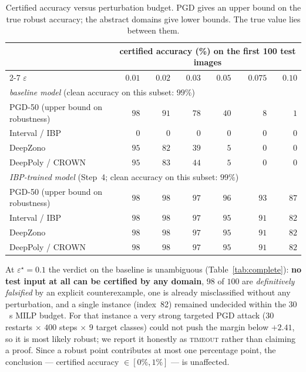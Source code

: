 \documentclass[11pt,a4paper]{article}
\newcommand{\eps}{\varepsilon}
\begin{document}
\begin{table}[H]
\centering\small
\begin{tabular}{lrrrrrr}
\toprule
& \multicolumn{6}{c}{certified accuracy (\%) on the first 100 test images}\\
\cmidrule(l){2-7}
$\eps$ & $0.01$ & $0.02$ & $0.03$ & $0.05$ & $0.075$ & $0.10$\\
\midrule
\multicolumn{7}{l}{\emph{baseline model} (clean accuracy on this subset: $99\%$)}\\
\quad PGD-50 (upper bound on robustness) & $98$ & $91$ & $78$ & $40$ & $8$ & $1$\\
\quad Interval / IBP  & $0$  & $0$  & $0$  & $0$ & $0$ & $0$\\
\quad DeepZono        & $95$ & $82$ & $39$ & $5$ & $0$ & $0$\\
\quad DeepPoly / CROWN& $95$ & $83$ & $44$ & $5$ & $0$ & $0$\\
\midrule
\multicolumn{7}{l}{\emph{IBP-trained model} (Step~4; clean accuracy on this subset: $99\%$)}\\
\quad PGD-50 (upper bound on robustness) & $98$ & $98$ & $97$ & $96$ & $93$ & $87$\\
\quad Interval / IBP   & $98$ & $98$ & $97$ & $95$ & $91$ & $82$\\
\quad DeepZono         & $98$ & $98$ & $97$ & $95$ & $91$ & $82$\\
\quad DeepPoly / CROWN & $98$ & $98$ & $97$ & $95$ & $91$ & $82$\\
\bottomrule
\end{tabular}
\caption{Certified accuracy versus perturbation budget. PGD gives an upper bound
on the true robust accuracy; the abstract domains give lower bounds. The true
value lies between them.}
\label{tab:sweep}
\end{table}

At $\eps^\star=0.1$ the verdict on the baseline is unambiguous
(Table~\ref{tab:complete}): \textbf{no test input at all can be certified by any
domain}, $98$ of $100$ are \emph{definitively falsified} by an explicit
counterexample, one is already misclassified without any perturbation, and a
single instance (index~82) remained undecided within the $30$~s MILP budget.
For that instance a very strong targeted PGD attack ($30$ restarts $\times$
$400$ steps $\times$ $9$ target classes) could not push the margin below
$+2.41$, so it is most likely robust; we report it honestly as
\textsc{timeout} rather than claiming a proof. Since a robust point contributes
at most one percentage point, the conclusion --- certified accuracy
$\in[0\%,1\%]$ --- is unaffected.
\end{document}
